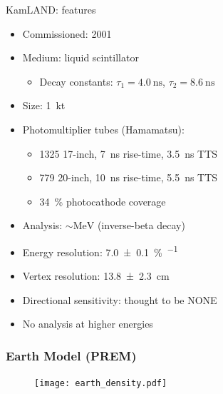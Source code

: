 \documentclass[14pt]{beamer}
\begin{document}
\begin{frame}[t]{KamLAND: features}
	\begin{itemize}
		\item Commissioned: \num{2001}
		\item Medium: liquid scintillator
			\begin{itemize}
				\item Decay constants: $\tau_1 = \SI{4.0}{\nano\second}$, $\tau_2 = \SI{8.6}{\nano\second}$
			\end{itemize}
		\item Size: \SI{1}{\kilo\tonne}
		\item Photomultiplier tubes (Hamamatsu):\\
			\begin{itemize}
				\item \num{1325} 17-inch, \SI{7}{\nano\second} rise-time,
					\SI{3.5}{\nano\second} TTS
				\item \num{779} 20-inch, \SI{10}{\nano\second} rise-time,
					\SI{5.5}{\nano\second} TTS
				\item \SI{34}{\percent} photocathode coverage
			\end{itemize}
		\item Analysis: $\sim\!\si{\mega\electronvolt}$ \APnue
			(inverse-beta decay)
		\item Energy resolution:
			\SI{7.0\pm0.1}{\percent\per{}}
		\item Vertex resolution:
			\SI{13.8\pm2.3}{\centi\meter}
		\item {\color{red}Directional sensitivity: thought to be NONE}
		\item {\color{red}No analysis at higher energies}
	\end{itemize}
\end{frame}

\begin{frame}
	\frametitle{Earth Model (PREM)}
	\begin{figure}
		\centering
		\texttt{[image: earth\_density.pdf]}
	\end{figure}
\end{frame}
\end{document}
